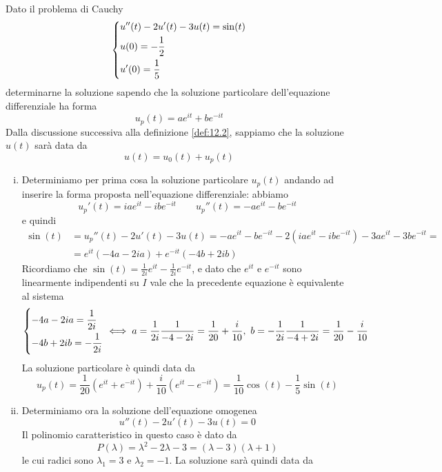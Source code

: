 \begin{example}
    Dato il problema di Cauchy
    \[
    \begin{dcases}
        u''(t)-2u'(t)-3u(t) = \sin(t)\\
        u(0) = -\frac{1}{2}\\
        u'(0) = \frac{1}{5}
    \end{dcases}
    \]
    determinarne la soluzione sapendo che la soluzione particolare dell'equazione differenziale ha forma
    \[
    u_p(t) = a e^{it}+be^{-it}
    \]
    Dalla discussione successiva alla definizione \ref{def:12.2}, sappiamo che la soluzione $u(t)$ sarà data da
    \[
    u(t) = u_0(t) + u_p(t)
    \]
    \begin{enumerate}[(i)]
        \item Determiniamo per prima cosa la soluzione particolare $u_p(t)$ andando ad inserire la forma proposta nell'equazione differenziale: abbiamo
        \[
        u_p'(t) = iae^{it}-ibe^{-it} \qquad u_p''(t) = -ae^{it} - be^{-it}
        \]
        e quindi
        \[
        \begin{split}
            \sin(t) & = u_p''(t) - 2u'(t)-3u(t) = -ae^{it}-be^{-it} -2(iae^{it}-ibe^{-it})-3ae^{it}-3be^{-it} = \\
            & = e^{it}(-4a-2ia)+e^{-it}(-4b+2ib)
        \end{split}
        \]
        Ricordiamo che $\sin(t) = \frac{1}{2i}e^{it}-\frac{1}{2i}e^{-it}$, e dato che $e^{it}$ e $e^{-it}$ sono linearmente indipendenti su $I$ vale che la precedente equazione è equivalente al sistema
        \[
        \begin{dcases}
            -4a-2ia = \frac{1}{2i}\\
            -4b+2ib = -\frac{1}{2i}
        \end{dcases}  \iff a = \frac{1}{2i}\frac{1}{-4-2i} = \frac{1}{20}+\frac{i}{10}, \ b= -\frac{1}{2i}\frac{1}{-4+2i} = \frac{1}{20}-\frac{i}{10}
        \]
        La soluzione particolare è quindi data da
        \[
        u_p(t) = \frac{1}{20}\left(e^{it}+e^{-it}\right) + \frac{i}{10}\left(e^{it}-e^{-it}\right) = \frac{1}{10}\cos(t) -\frac{1}{5}\sin(t)
        \]
        \item Determiniamo ora la soluzione dell'equazione omogenea
        \[
        u''(t)-2u'(t)-3u(t) = 0
        \]
        Il polinomio caratteristico in questo caso è dato da
        \[
        P(\lambda) = \lambda^2 -2\lambda-3 = (\lambda-3)(\lambda+1)
        \]
        le cui radici sono $\lambda_1 = 3$ e $\lambda_2 = -1$. La soluzione sarà quindi data da

\end{enumerate}
\end{example}
